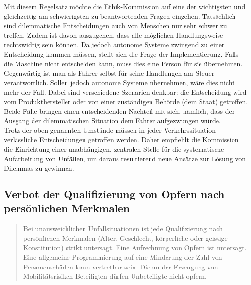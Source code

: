 \documentclass[twoside,a4paper,12pt]{article}
\begin{document}
Mit diesem Regelsatz möchte die Ethik-Kommission auf eine der wichtigsten und gleichzeitig am schwierigsten zu beantwortenden Fragen eingehen. Tatsächlich sind dilemmatische Entscheidungen auch von Menschen nur sehr schwer zu treffen. Zudem ist davon auszugehen, dass alle möglichen Handlungsweise rechtswidrig sein können.
Da jedoch autonome Systeme zwingend zu einer Entscheidung kommen müssen, stellt sich die Frage der Implementierung. Falls die Maschine nicht entscheiden kann, muss
dies eine Person für sie übernehmen. Gegenwärtig ist man als Fahrer selbst für seine Handlungen am Steuer verantwortlich. Sollen jedoch autonome Systeme übernehmen,
wäre dies nicht mehr der Fall. Dabei sind verschiedene Szenarien denkbar: die Entscheidung wird vom Produkthersteller oder von einer zuständigen Behörde (dem Staat) getroffen. Beide Fälle bringen einen entscheidenden Nachteil mit sich, nämlich, dass der Ausgang der dilemmatischen Situation dem Fahrer aufgezwungen würde. \\

Trotz der oben genannten Umstände müssen in jeder Verkehrssituation verlässliche Entscheidungen getroffen werden. Daher empfiehlt die Kommission die Einrichtung 
einer unabhängigen, zentralen Stelle für die systematische Aufarbeitung von Unfällen, um daraus resultierend neue Ansätze zur Lösung von Dilemmas zu gewinnen.\\

\subsection{Verbot der Qualifizierung von Opfern nach persönlichen Merkmalen} \label{VerbotDerQualifizierungMoeglicherOpferNachPersönlichenMerkmalen}
\begin{quote}
\glqq
Bei unausweichlichen Unfallsituationen ist jede Qualifizierung nach persönlichen Merkmalen (Alter, Geschlecht, 
körperliche oder geistige Konstitution) strikt untersagt. Eine
Aufrechnung von Opfern ist untersagt. Eine allgemeine Programmierung auf eine Minderung der Zahl von Personenschäden 
kann vertretbar sein. Die an der Erzeugung von
Mobilitätsrisiken Beteiligten dürfen Unbeteiligte nicht opfern.\grqq\mbox{~\cite[S. 11]{ek}}
\end{quote}
\end{document}
